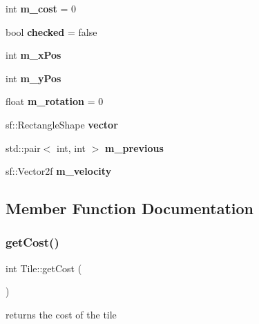 \begin{DoxyCompactItemize}
\mbox{\label{class_tile_abc51d238c3442bff65389f7f5e9117ce}} 
int {\bfseries m\+\_\+cost} = 0
\item 
\mbox{\label{class_tile_a745808194d4744166950988bb0325287}} 
bool {\bfseries checked} = false
\item 
\mbox{\label{class_tile_a4b7834863baca03da20b6610a78fb92c}} 
int {\bfseries m\+\_\+x\+Pos}
\item 
\mbox{\label{class_tile_a8dbd026dadf07dd48f67482b1e1a5c34}} 
int {\bfseries m\+\_\+y\+Pos}
\item 
\mbox{\label{class_tile_a7cbd93244de9145a765ce94b7debf908}} 
float {\bfseries m\+\_\+rotation} = 0
\item 
\mbox{\label{class_tile_a03d3ff2535fa7a8efb00150040abc7a2}} 
sf\+::\+Rectangle\+Shape {\bfseries vector}
\item 
\mbox{\label{class_tile_aae83b7f825a28703b83197af08a00cbb}} 
std\+::pair$<$ int, int $>$ {\bfseries m\+\_\+previous}
\item 
\mbox{\label{class_tile_a4932f9e2ac170cbadec3ed0c84220b5c}} 
sf\+::\+Vector2f {\bfseries m\+\_\+velocity}
\end{DoxyCompactItemize}


\subsection{Member Function Documentation}
\mbox{\label{class_tile_a80b48572e18fc5b34c0e707302d97d8c}} 
\subsubsection{\texorpdfstring{getCost()}{getCost()}}
{\footnotesize\ttfamily int Tile\+::get\+Cost (\begin{DoxyParamCaption}{ }\end{DoxyParamCaption})}



returns the cost of the tile 

